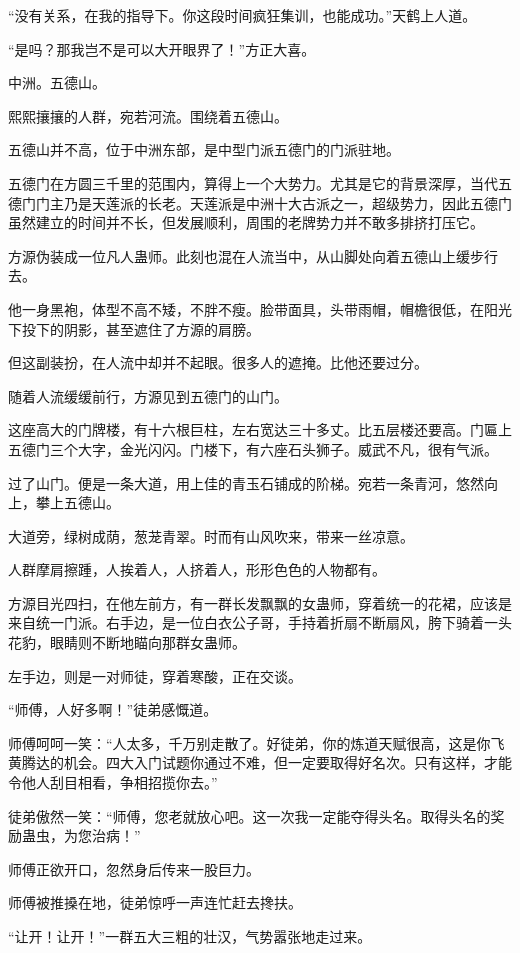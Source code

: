 \begin{this_body}
“没有关系，在我的指导下。你这段时间疯狂集训，也能成功。”天鹤上人道。

“是吗？那我岂不是可以大开眼界了！”方正大喜。

中洲。五德山。

熙熙攘攘的人群，宛若河流。围绕着五德山。

五德山并不高，位于中洲东部，是中型门派五德门的门派驻地。

五德门在方圆三千里的范围内，算得上一个大势力。尤其是它的背景深厚，当代五德门门主乃是天莲派的长老。天莲派是中洲十大古派之一，超级势力，因此五德门虽然建立的时间并不长，但发展顺利，周围的老牌势力并不敢多排挤打压它。

方源伪装成一位凡人蛊师。此刻也混在人流当中，从山脚处向着五德山上缓步行去。

他一身黑袍，体型不高不矮，不胖不瘦。脸带面具，头带雨帽，帽檐很低，在阳光下投下的阴影，甚至遮住了方源的肩膀。

但这副装扮，在人流中却并不起眼。很多人的遮掩。比他还要过分。

随着人流缓缓前行，方源见到五德门的山门。

这座高大的门牌楼，有十六根巨柱，左右宽达三十多丈。比五层楼还要高。门匾上五德门三个大字，金光闪闪。门楼下，有六座石头狮子。威武不凡，很有气派。

过了山门。便是一条大道，用上佳的青玉石铺成的阶梯。宛若一条青河，悠然向上，攀上五德山。

大道旁，绿树成荫，葱茏青翠。时而有山风吹来，带来一丝凉意。

人群摩肩擦踵，人挨着人，人挤着人，形形色色的人物都有。

方源目光四扫，在他左前方，有一群长发飘飘的女蛊师，穿着统一的花裙，应该是来自统一门派。右手边，是一位白衣公子哥，手持着折扇不断扇风，胯下骑着一头花豹，眼睛则不断地瞄向那群女蛊师。

左手边，则是一对师徒，穿着寒酸，正在交谈。

“师傅，人好多啊！”徒弟感慨道。

师傅呵呵一笑：“人太多，千万别走散了。好徒弟，你的炼道天赋很高，这是你飞黄腾达的机会。四大入门试题你通过不难，但一定要取得好名次。只有这样，才能令他人刮目相看，争相招揽你去。”

徒弟傲然一笑：“师傅，您老就放心吧。这一次我一定能夺得头名。取得头名的奖励蛊虫，为您治病！”

师傅正欲开口，忽然身后传来一股巨力。

师傅被推搡在地，徒弟惊呼一声连忙赶去搀扶。

“让开！让开！”一群五大三粗的壮汉，气势嚣张地走过来。


\end{this_body}
